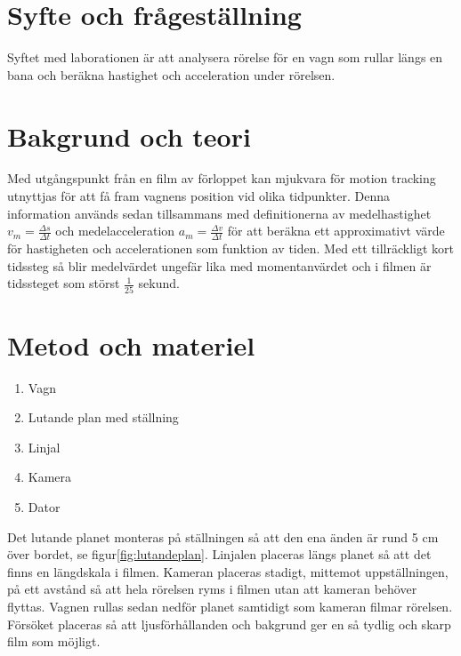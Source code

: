 \documentclass[11p, titlepage, oneside, a4paper]{article}
\begin{document}
	\newpage

	
	\setlength{\parindent}{0pt}
	\setlength{\parskip}{10pt}
	
	\section{Syfte och frågeställning}
		Syftet med laborationen är att analysera rörelse för en vagn som rullar längs en bana och beräkna hastighet och
        acceleration under rörelsen.

	\section{Bakgrund och teori}
        Med utgångspunkt från en film av förloppet kan mjukvara för motion tracking utnyttjas för att få fram vagnens
        position vid olika tidpunkter.
        Denna information används sedan tillsammans med definitionerna av medelhastighet $v_m = \frac{\Delta s}{\Delta t}$ och medelacceleration $a_m = \frac{\Delta v}{\Delta t}$ för att beräkna ett approximativt värde
        för hastigheten och accelerationen som funktion av tiden.
        Med ett tillräckligt kort tidssteg så blir medelvärdet ungefär lika med momentanvärdet och i filmen är tidssteget som störst $\frac{1}{25}$ sekund.  \parencite{impuls}
	

	\section{Metod och materiel}
        \begin{enumerate}
            \item Vagn
            \item Lutande plan med ställning
            \item Linjal
            \item Kamera
            \item Dator
        \end{enumerate}
        
        Det lutande planet monteras på ställningen så att den ena änden är rund 5 cm över bordet, se figur\ref{fig:lutandeplan}.
        Linjalen placeras längs planet så att det finns en längdskala  i filmen.
        Kameran placeras stadigt, mittemot uppställningen, på ett avstånd så att hela rörelsen ryms i filmen utan att
        kameran behöver flyttas.
        Vagnen rullas sedan nedför planet samtidigt som kameran filmar rörelsen.
        Försöket placeras så att ljusförhållanden och bakgrund ger en så tydlig och skarp film som möjligt.
        
\end{document}
